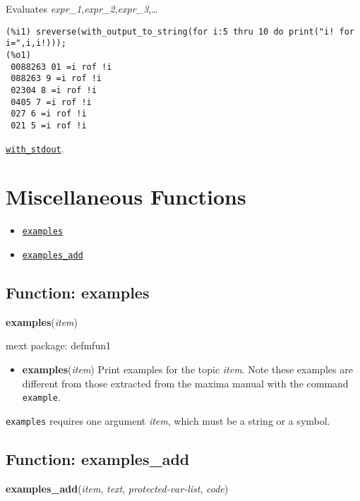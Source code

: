 \documentclass[]{article}
\begin{document}
\vspace{5 pt}
Evaluates {\it expr\_1},{\it expr\_2},{\it expr\_3},\ldots 

\vspace{5 pt}


\begin{Verbatim}[frame=single]
(%i1) sreverse(with_output_to_string(for i:5 thru 10 do print("i! for i=",i,i!)));
(%o1) 
 0088263 01 =i rof !i
 088263 9 =i rof !i
 02304 8 =i rof !i
 0405 7 =i rof !i
 027 6 =i rof !i
 021 5 =i rof !i
\end{Verbatim}


 \hyperlink{with_stdout}{{\tt with\_stdout}}.

\vspace{5 pt}


\section{Miscellaneous Functions}
\begin{itemize}
\item \hyperlink{examples}{{\tt examples}}
\item \hyperlink{examples_add}{{\tt examples\_add}}
\end{itemize}
\subsection{Function: examples\label{sec:examples}}
\hypertarget{examples}{}
{\bf examples}({\it item})


\noindent mext package: defmfun1



\vspace{5 pt}
\begin{itemize}
\item[] {\bf examples}({\it item})
  Print examples for the topic {\it item}. Note these examples are different from those extracted from the maxima manual with the command \verb#example#. 

\end{itemize}
   {\tt examples} requires one argument {\it item}, which must be a string or a symbol.


\vspace{5 pt}


\subsection{Function: examples\_add\label{sec:examples_add}}
\hypertarget{examples_add}{}
{\bf examples\_add}({\it item}, {\it text}, {\it protected-var-list}, {\it code})
\end{document}
